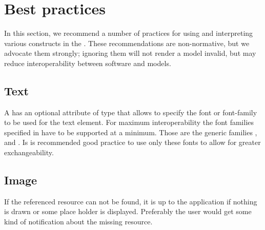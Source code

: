 
\section{Best practices}
\label{best-practices}

In this section, we recommend a number of practices for using and
interpreting various constructs in the \RenderPackage.
These recommendations are non-normative, but we advocate them strongly;
ignoring them will not render a model invalid, but may reduce
interoperability between software and models.

\subsection{Text}

A \Text has an optional attribute  of type
 that allows to specify the font or font-family to be used for 
the text element. For maximum interoperability the font families specified in 
\FontFamily have to be supported at a minimum. Those are the generic families 
,  and . Is is recommended good 
practice to use only these fonts to allow for greater exchangeability.

\subsection{Image}

If the referenced resource can not be found, it is up to the application if 
nothing is drawn or some place holder is displayed. Preferably the user would 
get some kind of notification about the missing resource.

